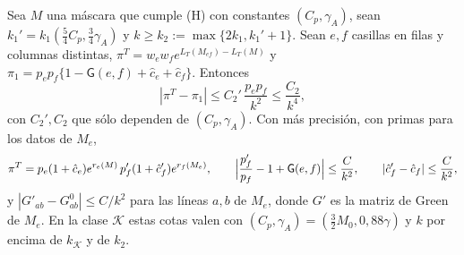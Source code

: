 
\begin{corolario}\label{cor:dos-casillas}
Sea $M$ una máscara que cumple \textup{(H)} con constantes $(C_p,\gamma_A)$, sean
$k_1'=k_1(\tfrac54C_p,\tfrac34\gamma_A)$ y $k\ge k_2:=\max\{2k_1,k_1'+1\}$. Sean $e,f$ casillas en filas
y columnas distintas, $\pi^T=w_ew_fe^{L_T(M_{ef})-L_T(M)}$ y
$\pi_1=p_ep_f\{1-\mathsf G(e,f)+\hat c_e+\hat c_f\}$. Entonces
\[
 |\pi^T-\pi_1|\le C_2'\,\frac{p_ep_f}{k^2}\le\frac{C_2}{k^4},
\]
con $C_2',C_2$ que sólo dependen de $(C_p,\gamma_A)$. Con más precisión, con primas para los datos de
$M_e$,
\begin{equation}\label{eq:producto-inserciones}
 \pi^T=p_e(1+\hat c_e)e^{r_e(M)}\,p'_f(1+\hat c'_f)e^{r_f(M_e)},\qquad
 \Bigl|\frac{p'_f}{p_f}-1+\mathsf G(e,f)\Bigr|\le\frac C{k^2},\qquad
 |\hat c'_f-\hat c_f|\le\frac C{k^2},
\end{equation}
y $|G'_{ab}-G^0_{ab}|\le C/k^2$ para las líneas $a,b$ de $M_e$, donde $G'$ es la matriz de Green de
$M_e$. En la clase $\mathcal K$ estas cotas valen con $(C_p,\gamma_A)=(\tfrac32M_0,0{,}88\gamma)$ y $k$
por encima de $k_{\mathcal K}$ y de $k_2$.
\end{corolario}
